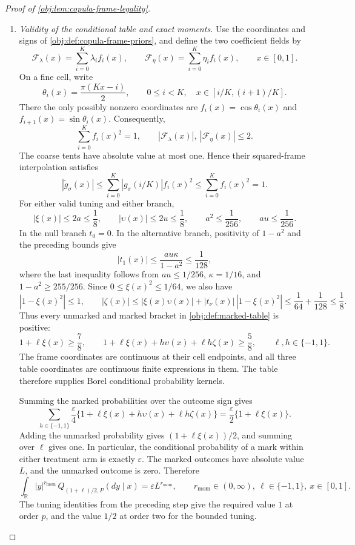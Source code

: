 \begin{proof}[Proof of \cref{obj:lem:copula-frame-legality}]
\begin{enumerate}
\item \textit{Validity of the conditional table and exact moments.}
Use the coordinates and signs of \cref{obj:def:copula-frame-priors}, and define the two coefficient fields by
\[
\mathcal F_\lambda(x)=\sum_{i=0}^{K}\lambda_i f_i(x),
\qquad
\mathcal F_\eta(x)=\sum_{i=0}^{K}\eta_i f_i(x),
\qquad x\in[0,1].
\]
On a fine cell, write
\[
\theta_i(x)=\frac{\pi(Kx-i)}2,
\qquad
0\le i<K,\quad x\in[i/K,(i+1)/K].
\]
There the only possibly nonzero coordinates are
\(f_i(x)=\cos\theta_i(x)\) and
\(f_{i+1}(x)=\sin\theta_i(x)\). Consequently,
\[
\sum_{i=0}^{K}f_i(x)^2=1,\qquad
|\mathcal F_\lambda(x)|,\ |\mathcal F_\eta(x)|\le2.
\]
The coarse tents have absolute value at most one. Hence their squared-frame interpolation satisfies
\[
|\widetilde g_\sigma(x)|
\le\sum_{i=0}^{K}|g_\sigma(i/K)|f_i(x)^2
\le\sum_{i=0}^{K}f_i(x)^2=1.
\]
For either valid tuning and either branch,
\[
|\xi(x)|\le2a\le\frac18,\qquad
|\upsilon(x)|\le2u\le\frac18,
\qquad
a^2\le\frac1{256},\qquad au\le\frac1{256}.
\]
In the null branch \(t_0=0\). In the alternative branch, positivity of \(1-a^2\) and the preceding bounds give
\[
|t_1(x)|
\le\frac{au\kappa}{1-a^2}
\le\frac1{128},
\]
where the last inequality follows from
\(au\le1/256\), \(\kappa=1/16\), and
\(1-a^2\ge255/256\). Since
\(0\le\xi(x)^2\le1/64\), we also have
\[
|1-\xi(x)^2|\le1,
\qquad
|\zeta(x)|
\le|\xi(x)\upsilon(x)|
   +|t_\nu(x)|\,|1-\xi(x)^2|
\le\frac1{64}+\frac1{128}\le\frac18.
\]
Thus every unmarked and marked bracket in
\cref{obj:def:marked-table} is positive:
\[
1+\ell\xi(x)\ge\frac78,
\qquad
1+\ell\xi(x)+h\upsilon(x)+\ell h\zeta(x)
\ge\frac58,
\qquad \ell,h\in\{-1,1\}.
\]
The frame coordinates are continuous at their cell endpoints, and all three table coordinates are continuous finite expressions in them. The table therefore supplies Borel conditional probability kernels.

Summing the marked probabilities over the outcome sign gives
\[
\sum_{h\in\{-1,1\}}
\frac{\varepsilon}{4}
\{1+\ell\xi(x)+h\upsilon(x)+\ell h\zeta(x)\}
=\frac{\varepsilon}{2}\{1+\ell\xi(x)\}.
\]
Adding the unmarked probability gives
\((1+\ell\xi(x))/2\), and summing over \(\ell\) gives one. In particular, the conditional probability of a mark within either treatment arm is exactly \(\varepsilon\). The marked outcomes have absolute value \(L\), and the unmarked outcome is zero. Therefore
\[
\int_{\mathbb R}|y|^{r_{\mathrm{mom}}}
\,Q_{(1+\ell)/2,P}(dy\mid x)
=\varepsilon L^{r_{\mathrm{mom}}},
\qquad
r_{\mathrm{mom}}\in(0,\infty),\
\ell\in\{-1,1\},\ x\in[0,1].
\]
The tuning identities from the preceding step give the required value \(1\) at order \(p\), and the value \(1/2\) at order two for the bounded tuning.


\end{enumerate}
\end{proof}
